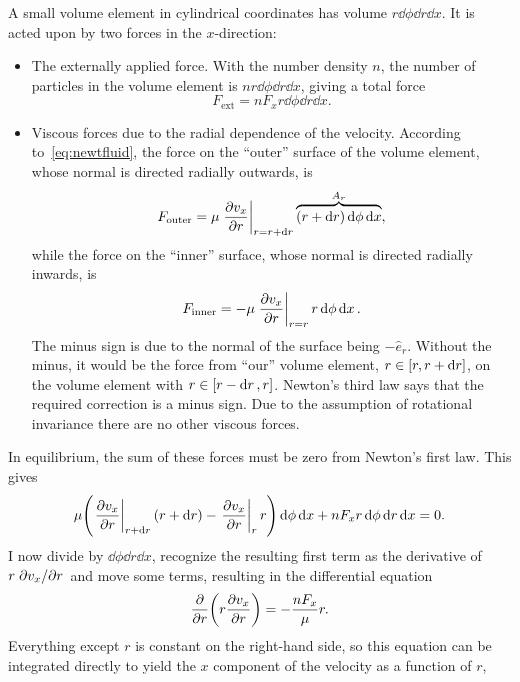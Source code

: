 \documentclass[11pt,british,a4paper]{report}
\begin{document}
A small volume element in cylindrical coordinates has volume \(r\dd{\phi}\dd{r}\dd{x}\). It is acted upon by two forces in the \(x\)-direction:
\begin{itemize}
    \item The externally applied force. With the number density \(n\), the number of particles in the volume element is \(nr\dd{\phi}\dd{r}\dd{x}\), giving a total force
        \begin{equation}
            F_{\text{ext}} = nF_xr\dd{\phi}\dd{r}\dd{x}.
        \end{equation}
    \item
        Viscous forces due to the radial dependence of the velocity. According to~\vref{eq:newtfluid}, the force on the ``outer'' surface of the volume element, whose normal is directed radially outwards, is
        \begin{equation}
            F_{\text{outer}} = \mu \eval{\pdv{v_x}{r}}_{r=r+\dd{r}}\overbrace{\qty(r+\dd{r})\dd{\phi}\dd{x}}^{A_r},
        \end{equation}
        while the force on the ``inner'' surface, whose normal is directed radially inwards, is
        \begin{equation}
            F_{\text{inner}} = -\mu \eval{\pdv{v_x}{r}}_{r=r}r\dd{\phi}\dd{x}.
        \end{equation}
        The minus sign is due to the normal of the surface being \(-\hat{e}_r\). Without the minus, it would be the force from ``our'' volume element, \(r\in\qty[r,r+\dd{r}]\), on the volume element with \(r\in\qty[r-\dd{r},r]\). Newton's third law says that the required correction is a minus sign. Due to the assumption of rotational invariance there are no other viscous forces.
\end{itemize}
In equilibrium, the sum of these forces must be zero from Newton's first law. This gives
\begin{equation}
    \mu\qty(\eval{\pdv{v_x}{r}}_{r+\dd{r}}\qty(r+\dd{r})-\eval{\pdv{v_x}{r}}_{r}r)\dd{\phi}\dd{x} + nF_xr\dd{\phi}\dd{r}\dd{x} = 0.
\end{equation}
I now divide by \(\dd{\phi}\dd{r}\dd{x}\), recognize the resulting first term as the derivative of \(r\pdv*{v_x}{r}\) and move some terms, resulting in the differential equation
\begin{equation}
    \pdv{r}(r\pdv{v_x}{r}) = -\frac{nF_x}{\mu}r.
\end{equation}
Everything except \(r\) is constant on the right-hand side, so this equation can be integrated directly to yield the \(x\) component of the velocity as a function of \(r\),
\end{document}
